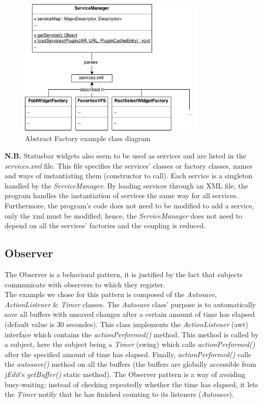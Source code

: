 \begin{figure}[h!]
    \includegraphics[width=0.8\textwidth]{images/abstractfactory.png}
    \centering
    \caption{Abstract Factory example class diagram}
\end{figure}

\begin{framehint2}
    \textbf{N.B.} Statusbar widgets also seem to be used as services and are
    listed in the \emph{services.xml} file. This file specifies the services'
    classes or factory classes, names and ways of instantiating them
    (constructor to call).
    Each service is a singleton handled by the \emph{ServiceManager}.
    By loading services through an XML file, the program handles the
    instantiation of services the same way for all services. Furthermore, the
    program's code does not need to be modified to add a service, only the
    xml must be modified; hence, the \emph{ServiceManager} does not need to
    depend on all the services' factories and the coupling is reduced.
\end{framehint2}
\newpage

\subsection{Observer}
The Observer is a behavioral pattern, it is justified by the fact that
subjects communicate with observers to which they register.\\

The example we chose for this pattern is composed of the
\emph{Autosave}\footnotemark[1]{}, \emph{ActionListener} \& \emph{Timer} classes.
The \emph{Autosave} class' purpose is to automatically save all buffers with
unsaved changes after a certain amount of time has elapsed (default
value is 30 secondes). This class implements the \emph{ActionListener}
(awt) interface which contains the \emph{actionPerformed()} method. This
method is called by a subject, here the subject being a \emph{Timer}
(swing) which calls \emph{actionPerformed()} after the specified amount
of time has elapsed. Finally, \emph{actionPerformed()} calls the
\emph{autosave()} method on all the buffers (the buffers are globally
accessible from \emph{jEdit}'s \emph{getBuffer()} static method). The
Observer pattern is a way of avoiding busy-waiting: instead of checking
repeatedly whether the time has elapsed, it lets the \emph{Timer} notify
that he has finished counting to its listeners (\emph{Autosave}).

